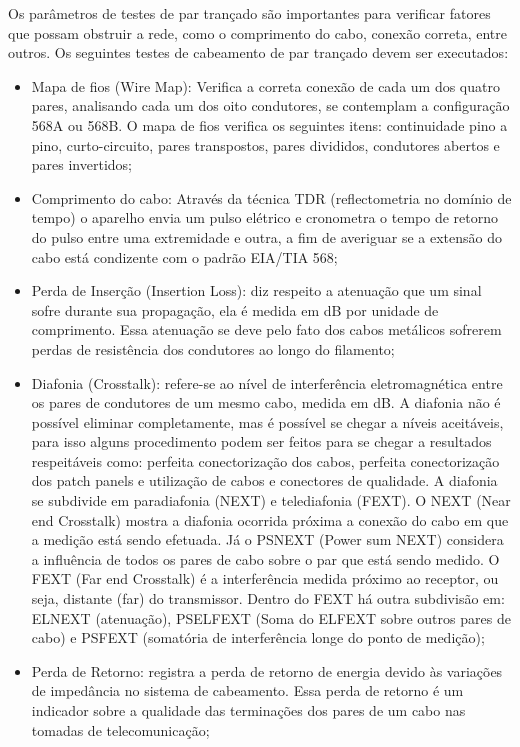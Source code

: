 \documentclass[	DIV=calc,%
							paper=a4,%
							fontsize=12pt,%
							onecolumn]{scrartcl}	 					%
\begin{document}
Os parâmetros de testes de par trançado são importantes para verificar fatores que possam obstruir a rede, como o comprimento do cabo, conexão correta, entre outros. Os seguintes testes de cabeamento de par trançado devem ser executados: 

\begin{itemize}
	\item Mapa de fios (Wire Map): Verifica a correta conexão de cada um dos quatro pares, analisando cada um dos oito condutores, se contemplam a configuração 568A ou	568B. O mapa de fios verifica os seguintes itens: continuidade pino a pino, curto-circuito, pares transpostos, pares divididos, condutores abertos e pares invertidos;
	\item Comprimento do cabo: Através da técnica TDR (reflectometria no domínio de tempo) o aparelho envia um pulso elétrico e cronometra o tempo de retorno do pulso entre uma extremidade e outra, a fim de averiguar se a extensão do cabo está condizente com o padrão EIA/TIA 568;
	\item Perda de Inserção (Insertion Loss): diz respeito a atenuação que um sinal sofre durante sua propagação, ela é medida em dB por unidade de comprimento. Essa atenuação se deve pelo fato dos cabos metálicos sofrerem perdas de resistência dos condutores ao longo do filamento;
	\item Diafonia (Crosstalk): refere-se ao nível de interferência eletromagnética entre os pares de condutores de um mesmo cabo, medida em dB. A diafonia não é possível eliminar completamente, mas é possível se chegar a níveis aceitáveis, para isso alguns procedimento podem ser feitos para se chegar a resultados respeitáveis como: perfeita conectorização dos cabos, perfeita conectorização dos patch panels e utilização de cabos e conectores de qualidade. A diafonia se subdivide em paradiafonia (NEXT) e telediafonia (FEXT). O NEXT (Near end Crosstalk) mostra a diafonia ocorrida próxima a conexão do cabo em que a medição está sendo efetuada. Já o PSNEXT (Power sum NEXT) considera a influência de todos os pares de cabo sobre o par que está sendo medido. O FEXT (Far end Crosstalk) é a interferência medida próximo ao
	receptor, ou seja, distante (far) do transmissor. Dentro do FEXT há outra subdivisão em: ELNEXT (atenuação), PSELFEXT (Soma do ELFEXT sobre outros pares de cabo) e PSFEXT (somatória de interferência longe do ponto de medição);
	\item Perda de Retorno: registra a perda de retorno de energia devido às variações de impedância no sistema de cabeamento. Essa perda de retorno é um indicador sobre a qualidade das terminações dos pares de um cabo nas tomadas de telecomunicação;

\end{itemize}
\end{document}
